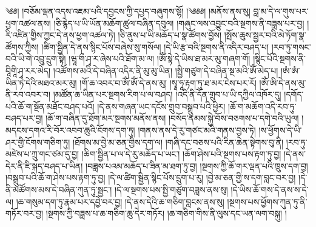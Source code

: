 \setcounter{footnote}{0} 
༄༅། །བཅོམ་ལྡན་འདས་འཇམ་པའི་དབྱངས་ཀྱི་དཔྱད་བཞུགས་སྷོ། །༄༅༅། །མནོས་ནས་སུ། བླ་མ་དེ་ལ་གུས་པར་ཕྱག་འཚལ་ནས། །ཅི་རྙེད་པ་ཡི་ཡོན་མཆོག་ཚུལ་བཞིན་དབུལ། །གཞུང་ལས་འབྱུང་བའི་སྔགས་ནི་བཟླས་པར་བྱ། །རི་འཛིན་གྱིས་ཀྱང་དེ་ནས་ཕྱག་འཚལ་ཏེ། །ཅི་ནུས་པ་ཡི་མཆོད་པ་སྣ་ཚོགས་བྱོས། །སྤོས་ཆུས་སྦྱར་བའི་མེ་ཏོག་སྣ་ཚོགས་ཀྱིས། །ཚིག་སྦྱིན་དེ་ནས་སྙིང་པོས་བཞེས་སུ་གསོལ། །དེ་ཡི་རྩ་བའི་སྔགས་ནི་འདིར་བཤད་པ། །རབ་ཏུ་གསང་བའི་ཡི་གེ་འབྲུ་དྲུག་སྟེ། །ཝཱ་གྀ་ཤྭ་ར་ཞེས་པའི་ཐོག་མ་ལ། །ཨོཾ་སྟེ་དེ་ཡིས་ཐ་མར་མུ་གཞག་གོ། །སྙིང་པོའི་སྔགས་ནི་བཱིགཱི་ཤྭ་རར་མེད། །འཚོགས་མའི་དེ་བཞིན་འདིར་ནི་མུ་མུ་ཡིན། །སྤྱི་གཙུག་དེ་བཞིན་སྔ་མའི་ཨོཾ་མེད་པ། །ཨཾ་ཨཾ་ཡིན་ཏེ་དེའི་མཐའ་མར་མུ། །གོ་ཆ་འབར་བ་ཨོཾ་ཨོཾ་དེ་ནས་མུ། །སྭཱ་ཧཱ་རྟག་ཏུ་ཐ་མར་ངེས་པར་རོ། །ཨོཾ་ཨི་དེ་ནས་མུ་ནི་རབ་འབར་བ། །མཚོན་ཆ་ཡིན་པར་སྔགས་རིག་པ་ལ་བཤད། །འདི་ནི་དོན་གྲུབ་པ་ཡི་དཀྱིལ་འཁོར་དུ། །དགོད་པའི་ཆོ་ག་སྔོན་མཐོང་བཤད་པའོ། །དེ་ནས་གཞན་ཡང་དངོས་གྲུབ་བསྒྲུབ་པའི་ཕྱིར། །ཆོ་ག་མཆོག་འདི་རབ་ཏུ་བཤད་པར་བྱ། །ཆོ་ག་བཞིན་དུ་ཐོག་མར་སྔགས་མནོས་ནས། །བསོད་ནམས་སྐྱེ་བོས་བཅགས་པ་དགེ་བའི་ཡུལ། །མདངས་དགའ་རི་བོར་འབབ་ཆུའི་ངོགས་དག་ཏུ། །གནས་ནས་དེ་རུ་གཙང་མའི་གནས་བྱས་ཏེ། །ས་ཕྱོགས་དེ་ཡི་ཤར་གྱི་ངོགས་གཅིག་ཏུ། །ཐོགས་མ་བྱེ་མ་ཅན་གྱིས་དག་ལ། །གཞི་དང་བཅས་པའི་རིན་ཆེན་སྟེགས་བུ་ནི། །རབ་ཏུ་མཛེས་པ་ཀྲུ་གང་ཙམ་དུ་བྱ། །ཆིག་སྦྱིན་པ་ལ་དེ་རུ་མཆོད་པ་ཡང་། །ཆོག་ཤེས་པའི་སྔགས་པས་རྟག་ཏུ་བྱ། །དེ་ནས་དེར་ནི་ཇི་སྐད་བཤད་པ་ཡིན། །བཟླས་པའམ་མཆོད་པ་ཟིན་མ་ཐག་ཏུ་བྱ། །སྔགས་ཀྱི་ཆོ་གར་ལྡན་པའི་ཁྲུས་དག་བྱ། །བསྒྲུབ་པའི་ཆོ་ག་ཤེས་པས་རྟག་ཏུ་བྱ། །དེ་ལ་ཚིག་སྦྱིན་སྙིང་པོས་དྲུག་པ་རུ། །བྱེ་མ་ཅན་གྱི་ས་དག་བླང་བར་བྱ། །དེ་ནི་མཚོགས་མས་དེ་བཞིན་ཀུན་ཏུ་སྦྱང་། །དེ་ལ་སྔགས་པས་སྤྱི་གཙུག་བཟླས་ནས་སུ། །དེ་ཡིས་ཆོ་གས་དེ་ནས་ས་དེ་ལ། །ཆ་གསུམ་དག་ཏུ་རྣམ་པར་དབྱེ་བར་བྱ། །དེ་ནས་དེའི་ཆ་གཅིག་བླངས་ནས་སུ། །སྔགས་པས་ཕྱོགས་ཀུན་ཏུ་ནི་གཏོར་བར་བྱ། །སྔགས་ཀྱི་བཟླས་པ་ཆ་གཅིག་ཆུ་དེར་གཏོར། །ཆ་གཅིག་གིས་ནི་ལུས་དང་ཡན་ལག་བསྐུ། །
